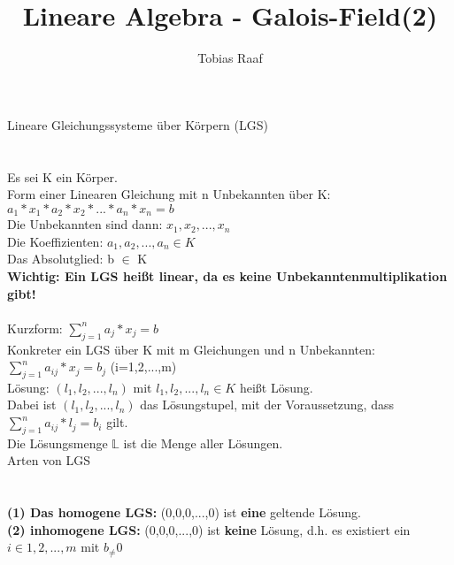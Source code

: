 \documentclass{scrartcl}
\title{Lineare Algebra - Galois-Field(2)}
\author{Tobias Raaf}
\begin{document}
	\Large Lineare Gleichungssysteme über Körpern (LGS)\\\\
	\normalsize\\
	Es sei K ein Körper.\\
	Form einer Linearen Gleichung mit n Unbekannten über K: $a_1*x_1*a_2*x_2*...*a_n*x_n=b$\\
	Die Unbekannten sind dann: $x_1,x_2,...,x_n$\\
	Die Koeffizienten: $a_1,a_2,...,a_n\in K$\\
	Das Absolutglied: b $\in$ K\\
	\textbf{Wichtig: Ein LGS heißt linear, da es keine Unbekanntenmultiplikation gibt!}\\
	\\
	Kurzform: $\sum_{j=1}^{n}a_{j}*x_{j}= b$\\
	Konkreter ein LGS über K mit m Gleichungen und n Unbekannten:\\
	$\sum_{j=1}^{n}a_{ij}*x_j=b_j$ (i=1,2,...,m)\\
	Lösung: $(l_1,l_2,...,l_n)$ mit $l_1,l_2,...,l_n\in K$ heißt Lösung.\\
	Dabei ist $(l_1,l_2,...,l_n)$ das Lösungstupel, mit der Voraussetzung, dass $\sum_{j=1}^{n}a_{ij}*l_j=b_i$ gilt.\\
	Die Lösungsmenge $\mathbb{L}$ ist die Menge aller Lösungen.\\
	\Large Arten von LGS\\\\
	\normalsize\\
	\textbf{(1) Das homogene LGS:} (0,0,0,...,0) ist \textbf{eine} geltende Lösung.\\
	\textbf{(2)  inhomogene LGS:} (0,0,0,...,0) ist \textbf{keine} Lösung, d.h. es existiert ein $i\in{1,2,...,m}$ mit $b_\neq0$\\
	
	
\end{document}
